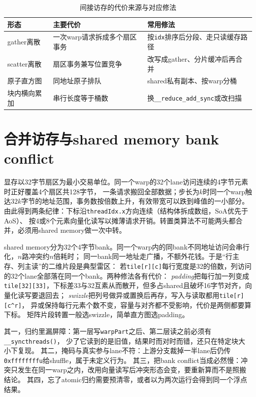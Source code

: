 \documentclass[12pt,a4paper,fontset=fandol]{ctexbook}
\newcommand{\Tp}[1]{\texttt{#1}}
\newcommand{\Bk}{\allowbreak}
\begin{document}
\begin{table}[H]
\centering
\caption{间接访存的代价来源与对应修法}
\begin{tabular}{@{}>{\raggedright\arraybackslash}p{}
  >{\raggedright\arraybackslash}p{}
  >{\raggedright\arraybackslash}p{}@{}}
\toprule
形态&主要代价&常用修法\\
\midrule
gather离散&一次warp请求拆成多个扇区事务&按\Tp{idx}排序后分段、走只读缓存路径\\
scatter离散&扇区事务兼写位置竞争&改写成gather、分片缓冲后再合并\\
原子直方图&同地址原子排队& shared私有副本、按warp分桶\\
块内横向累加&串行长度等于桶数&换\Tp{\_\_reduce\_add\_sync}或改扫描\\
\bottomrule
\end{tabular}
\end{table}

\section{合并访存与shared memory bank conflict}

显存以32字节扇区为最小交易单位。同一个warp的32个lane访问连续的4字节元素时正好覆盖4个扇区共128字节，
一条请求搬回全部数据；步长为$k$时同一个warp触达$32k$字节的地址范围，事务数按倍数上升，有效带宽可以跌到峰值的一小部分。
由此得到两条纪律：下标沿\Tp{threadIdx.x}方向连续（结构体拆成数组，SoA优先于AoS）、
按4或8个元素向量化读写以摊薄请求开销。转置类算法不可能两头都合并，必须用shared memory做一次中转。

shared memory分为32个4字节bank。同一个warp内的同bank不同地址访问会串行化，$n$路冲突约$n$倍耗时；
同一bank同一地址走广播，不额外花钱。于是``行主存、列主读''的二维片段是典型雷区：
若\Tp{tile[r][c]}每行宽度是32的倍数，列访问的32个lane全部落在同一个bank。两种修法各有代价：
\emph{padding}把每行加一列变成\Tp{tile[32][33]}，下标差33与32互素从而散开，但多占shared且破坏16字节对齐，向量化读写要退回去；
\emph{swizzle}把列号做异或置换后再存，写入与读取都用\Tp{tile[r][c\textasciicircum r]}，
异或保持每行元素个数不变，容量与对齐都不受影响，代价是两侧都要算下标。
矩阵片段转置一般选swizzle，简单直方图选padding。

\begin{warning}[title={本章最常在四个地方翻车}]
其一，归约里漏屏障：第一层写\Tp{warpPart}之后、第二层读之前必须有\Tp{\_{\Bk}\_{\Bk}syncthreads()}，
少了它读到的是旧值，结果时而对时而错，还只在特定块大小下复现。
其二，掩码与真实参与lane不符：上游分支裁掉一半lane后仍传\Tp{0xffffffffu}给shuffle，属于未定义行为。
其三，把bank conflict当成必然慢：冲突只发生在同一warp之内，改用向量读写后冲突形态会变，要重新算而不是照搬结论。
其四，忘了atomic归约需要预清零，或者以为两次运行会得到同一个浮点结果。
\end{warning}
\end{document}
